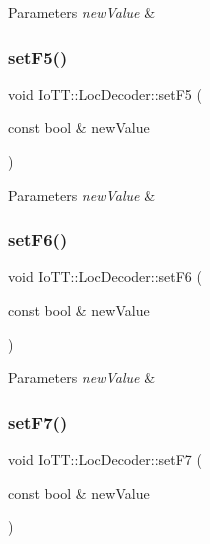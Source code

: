 \begin{DoxyParams}{Parameters}
{\em new\+Value} & \\
\hline
\end{DoxyParams}
\mbox{\label{classIoTT_1_1LocDecoder_afb9028105d0e9f3440ad4f72ac1385bf}} 
\subsubsection{\texorpdfstring{set\+F5()}{setF5()}}
{\footnotesize\ttfamily void Io\+T\+T\+::\+Loc\+Decoder\+::set\+F5 (\begin{DoxyParamCaption}\item[{const bool \&}]{new\+Value }\end{DoxyParamCaption})}


\begin{DoxyParams}{Parameters}
{\em new\+Value} & \\
\hline
\end{DoxyParams}
\mbox{\label{classIoTT_1_1LocDecoder_ae83b4bde9fed996fd18818875ea72017}} 
\subsubsection{\texorpdfstring{set\+F6()}{setF6()}}
{\footnotesize\ttfamily void Io\+T\+T\+::\+Loc\+Decoder\+::set\+F6 (\begin{DoxyParamCaption}\item[{const bool \&}]{new\+Value }\end{DoxyParamCaption})}


\begin{DoxyParams}{Parameters}
{\em new\+Value} & \\
\hline
\end{DoxyParams}
\mbox{\label{classIoTT_1_1LocDecoder_a161e0001a8ed2fbd6260269cec830218}} 
\subsubsection{\texorpdfstring{set\+F7()}{setF7()}}
{\footnotesize\ttfamily void Io\+T\+T\+::\+Loc\+Decoder\+::set\+F7 (\begin{DoxyParamCaption}\item[{const bool \&}]{new\+Value }\end{DoxyParamCaption})}


